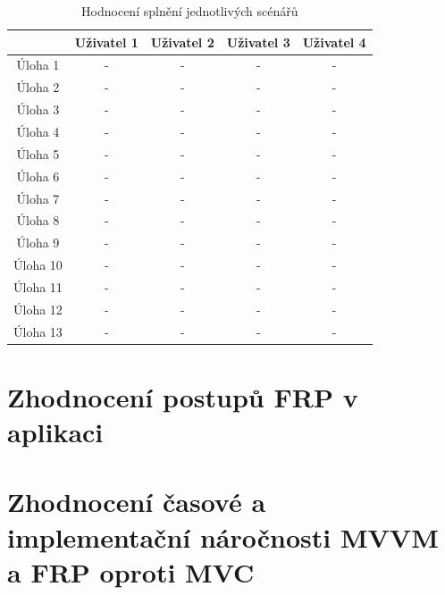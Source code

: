 \documentclass[thesis=M,czech]{FITthesis}[2012/06/26]
\begin{document}
\begin{table}\centering
 \begin{tabular}{ c | c | c | c | c |}
 	 & Uživatel 1 & Uživatel 2 & Uživatel 3 & Uživatel 4 \\
 	\hline
 	Úloha 1  & - & - & - & -\\
 	Úloha 2  & - & - & - & - \\
 	Úloha 3  & - & - & - & -\\
 	Úloha 4  & - & - & - & -\\
 	Úloha 5  & - & - & - & -\\
 	Úloha 6  & - & - & - & -\\
 	Úloha 7  & - & - & - & -\\
 	Úloha 8  & - & - & - & -\\
 	Úloha 9  & - & - & - & -\\
 	Úloha 10 & - & - & - & -\\
 	Úloha 11 & - & - & - & -\\
 	Úloha 12 & - & - & - & -\\
 	Úloha 13 & - & - & - & -\\
 \end{tabular}
 \caption[Hodnocení splnění jednotlivých scénářů]{Hodnocení splnění jednotlivých scénářů}\label{tab:ut_eval}
\end{table}


\section{Zhodnocení postupů FRP v aplikaci}

\section{Zhodnocení časové a implementační náročnosti MVVM a FRP oproti MVC}

\begin{conclusion}
\end{conclusion}




\appendix
\end{document}
